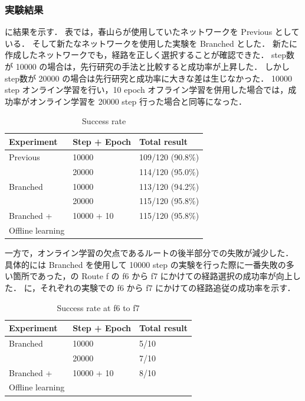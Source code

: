 \clearpage
\subsubsection{実験結果}
に結果を示す．
表では，春山らが使用していたネットワークを Previous としている．
そして新たなネットワークを使用した実験を Branched とした．
新たに作成したネットワークでも，経路を正しく選択することが確認できた．
step数が 10000 の場合は，先行研究の手法と比較すると成功率が上昇した．
しかしstep数が 20000 の場合は先行研究と成功率に大きな差は生じなかった．
10000 step オンライン学習を行い，10 epoch オフライン学習を併用した場合では，成功率がオンライン学習を 20000 step 行った場合と同等になった．

\begin{table}[h]
  \centering
  \caption{Success rate}
  \begin{tabular}{lll}
  \hline
  Experiment        & Step + Epoch & Total result     \\ \hline
  Previous          & 10000        & 109/120 (90.8\%) \\
                    & 20000        & 114/120 (95.0\%) \\ \hline
  Branched          & 10000        & 113/120 (94.2\%) \\ 
                    & 20000        & 115/120 (95.8\%) \\ \hline
  Branched +        & 10000 + 10   & 115/120 (95.8\%) \\ 
  Offline learning  &              &                  \\ \hline
  \end{tabular}
  \label{tab:result}
\end{table}

\clearpage
一方で，オンライン学習の欠点であるルートの後半部分での失敗が減少した．
具体的には Branched を使用して 10000 step の実験を行った際に一番失敗の多い箇所であった，の Route f の f6 から f7 にかけての経路選択の成功率が向上した．
に，それぞれの実験での f6 から f7 にかけての経路追従の成功率を示す．

\begin{table}[h]
  \centering
  \caption{Success rate at f6 to f7}
  \begin{tabular}{lll}
  \hline
  Experiment         & Step + Epoch & Total result \\ \hline
  Branched           & 10000        & 5/10         \\ 
                     & 20000        & 7/10         \\ \hline
  Branched +         & 10000 + 10   & 8/10         \\ 
  Offline learning   &              &              \\ \hline
  \end{tabular}
  \label{tab:f_result}
\end{table}

